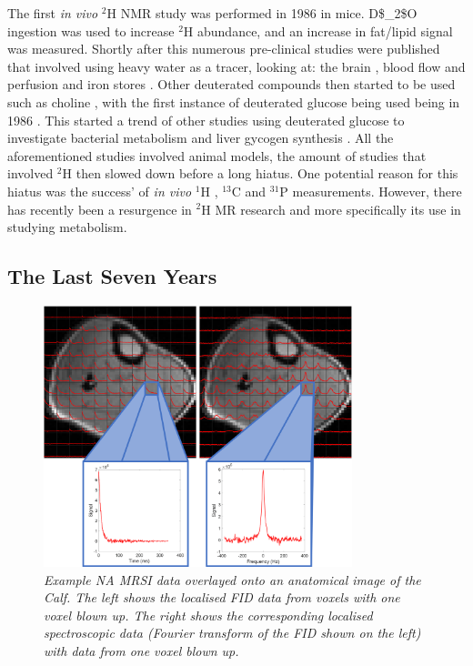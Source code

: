 The first \textit{in vivo} $^2$H NMR study was performed in 1986 \cite{Brereton1986PreliminarySpectroscopy} in mice. \Ac{D$_2$O} ingestion was used to increase $^2$H abundance, and an increase in fat/lipid signal was measured. Shortly after this numerous pre-clinical studies were published that involved using heavy water as a tracer, looking at: the brain \cite{Ewy1988DeuteriumSitu}, blood flow and perfusion \cite{Ackerman1987DeuteriumTracer.} and iron stores \cite{Irving1987InSpectroscopy}. Other deuterated compounds then started to be used such as choline \cite{Eng1990RenalStudy}, with the first instance of deuterated glucose being used being in 1986 \cite{Barrow1986NMRMobilis}. This started a trend of other studies using deuterated glucose to investigate bacterial metabolism \cite{Aguayo1988HighMetabolism.} and liver gycogen synthesis \cite{Goodman1989UseSynthesis}. All the aforementioned studies involved animal models, the amount of studies that involved $^2$H then slowed down before a long hiatus. One potential reason for this hiatus was the success' of \textit{in vivo} $^1$H \cite{Harada1984IdentificationScience}, $^{13}$C \cite{Cohen1980UseLiver} and $^{31}$P \cite{Sappey-Marinier1992EffectSpectroscopy} measurements. However, there has recently been a resurgence in $^2$H MR research and more specifically its use in studying metabolism.

\subsection{The Last Seven Years}

\begin{figure}[H]
    \centering
    \includegraphics[width=0.8\textwidth]{Figures/Intro/CSI.png}
    \caption{\textit{Example \ac{NA} \ac{MRSI} data overlayed onto an anatomical image of the Calf. The left shows the localised \ac{FID} data from voxels with one voxel blown up. The right shows the corresponding localised spectroscopic data (Fourier transform of the \ac{FID} shown on the left) with data from one voxel blown up.}}
    \label{fig:intro:CSI}
\end{figure}

